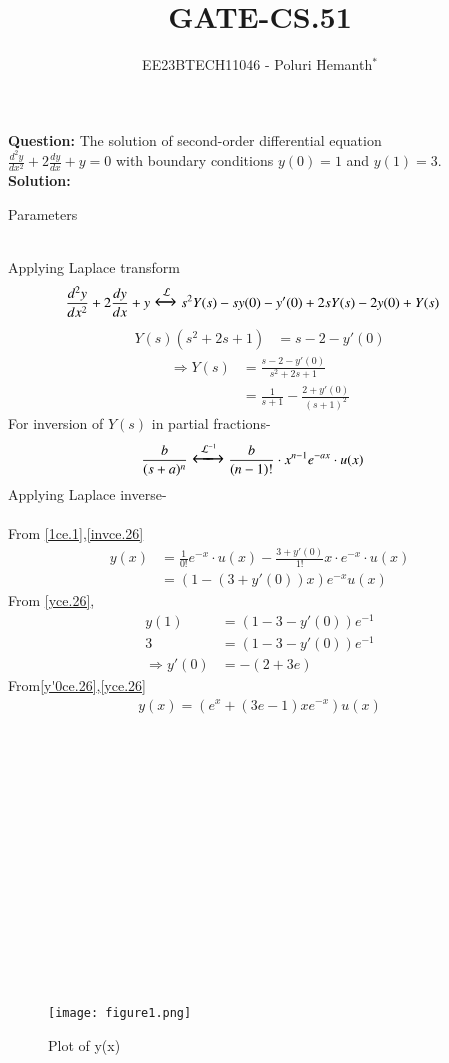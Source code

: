 \documentclass[journal,12pt,twocolumn]{IEEEtran}
\theoremstyle{remark}
\begin{document}

\vspace{3cm}

\title{GATE-CS.51}
\author{EE23BTECH11046 - Poluri Hemanth$^{*}$}
\maketitle
\textbf{Question:}
The solution of second-order differential equation \\ $\frac{d^2y}{dx^2}+2\frac{dy}{dx}+y=0$ with boundary conditions $y(0)=1$ and $y(1)=3$.\\
\textbf{Solution:}
\begin{table}[h!]
        
        \caption{Parameters}
        \label{tab:es.47}
\end{table}\\
Applying Laplace transform
\begin{align}
	\frac{d^2y}{dx^2}+2\frac{dy}{dx}+y&\Large\xleftrightarrow{\mathcal{L}}s^2Y(s)-sy(0)-y'(0)+2sY(s)-2y(0)+Y(s)
\end{align}
\begin{align}
	Y(s)(s^2+2s+1)&=s-2-y'(0)
\end{align}
\begin{align}
	\Rightarrow Y(s)&=\frac{s-2-y'(0)}{s^2+2s+1}\\
	&=\frac{1}{s+1}-\frac{2+y'(0)}{(s+1)^2}\label{1ce.1}
\end{align}
For inversion of $Y(s)$ in partial fractions-
\begin{align}
        &\frac{b}{(s+a)^n}\Large\xleftrightarrow{\mathcal{L}^{-1}}\frac{b}{(n-1)!}\cdot x^{n-1} e^{-ax}\cdot u(x)\label{invce.26}
\end{align}
Applying Laplace inverse-\\
\\From \eqref{1ce.1},\eqref{invce.26}
\begin{align}
	y(x)&=\frac{1}{0!} e^{-x}\cdot u(x)-\frac{3+y'(0)}{1!}x\cdot e^{-x}\cdot u(x)\\
	&=(1-(3+y'(0))x)e^{-x}u(x)\label{yce.26}
\end{align}
From \eqref{yce.26},
\begin{align}
	y(1)&=(1-3-y'(0))e^{-1}\\
	3&=(1-3-y'(0))e^{-1}\\
	\Rightarrow y'(0)&=-(2+3e)\label{y'0ce.26}
\end{align}
From\eqref{y'0ce.26},\eqref{yce.26}
\begin{align}
	y(x)=(e^x+(3e-1)xe^{-x})u(x)
\end{align}
\\
\\
\\
\\
\\
\\
\\
\\
\\
\\
\\
\\
\\
\\
\begin{figure}[h!]
    \centering
    \texttt{[image: figure1.png]}
        \caption{Plot of y(x)}
    \label{fig:enter-label}
\end{figure}
\end{document}

